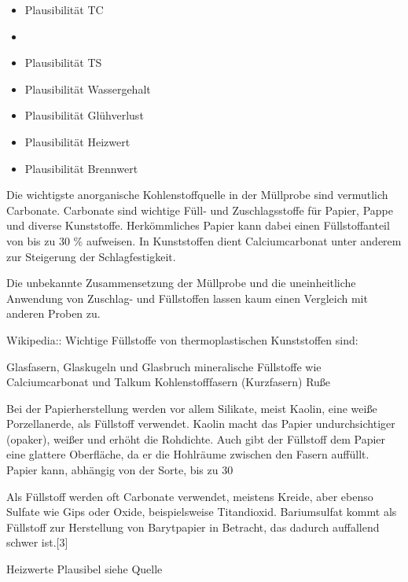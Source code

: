 \vspace*{5mm}

\begin{itemize}
	\item Plausibilität TC \cite{HansGunterRamke.}
	\item 
	\item Plausibilität TS
	\item Plausibilität Wassergehalt
	\item Plausibilität Glühverlust
	\item Plausibilität Heizwert \cite{S.Furkus.}
	\item Plausibilität Brennwert \cite{S.Furkus.}
\end{itemize}



\newpage

Die wichtigste anorganische Kohlenstoffquelle in der Müllprobe sind vermutlich Carbonate.
Carbonate sind wichtige Füll- und Zuschlagsstoffe für Papier, Pappe und diverse Kunststoffe. Herkömmliches Papier kann dabei einen Füllstoffanteil von bis zu 30 \% aufweisen. In Kunststoffen dient Calciumcarbonat unter anderem zur Steigerung der Schlagfestigkeit. 

Die unbekannte Zusammensetzung der Müllprobe und die uneinheitliche Anwendung von Zuschlag- und Füllstoffen lassen kaum einen Vergleich mit anderen Proben zu. 



Wikipedia::
Wichtige Füllstoffe von thermoplastischen Kunststoffen sind:

Glasfasern, Glaskugeln und Glasbruch
mineralische Füllstoffe wie Calciumcarbonat und Talkum
Kohlenstofffasern (Kurzfasern)
Ruße

Bei der Papierherstellung werden vor allem Silikate, meist Kaolin, eine weiße Porzellanerde, als Füllstoff verwendet. Kaolin macht das Papier undurchsichtiger (opaker), weißer und erhöht die Rohdichte. Auch gibt der Füllstoff dem Papier eine glattere Oberfläche, da er die Hohlräume zwischen den Fasern auffüllt. Papier kann, abhängig von der Sorte, bis zu 30 %

Als Füllstoff werden oft Carbonate verwendet, meistens Kreide, aber ebenso Sulfate wie Gips oder Oxide, beispielsweise Titandioxid. Bariumsulfat kommt als Füllstoff zur Herstellung von Barytpapier in Betracht, das dadurch auffallend schwer ist.[3] 

Heizwerte Plausibel siehe Quelle\\

